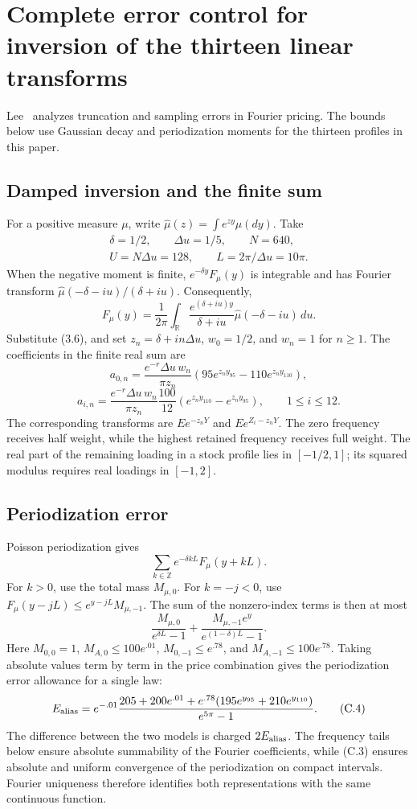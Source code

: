 \section{Complete error control for inversion of the thirteen linear transforms}

Lee~\cite{Lee2004} analyzes truncation and sampling errors in Fourier pricing. The bounds below use Gaussian decay and periodization moments for the thirteen profiles in this paper.

\subsection{Damped inversion and the finite sum}

For a positive measure \(\mu\), write \(\widehat\mu(z)=\int e^{zy}\mu(dy)\). Take
\[
\begin{gathered}
\delta=1/2,\qquad \Delta u=1/5,\qquad N=640,\\
U=N\Delta u=128,\qquad L=2\pi/\Delta u=10\pi.
\end{gathered}
\]
When the negative moment is finite, \(e^{-\delta y}F_\mu(y)\) is integrable and has Fourier transform \(\widehat\mu(-\delta-iu)/(\delta+iu)\). Consequently,
\[
F_\mu(y)=\frac1{2\pi}\int_{\mathbb R}
\frac{e^{(\delta+iu)y}}{\delta+iu}\widehat\mu(-\delta-iu)\,du.
\tag{C.1}
\]
Substitute (3.6), and set \(z_n=\delta+in\Delta u\), \(w_0=1/2\), and \(w_n=1\) for \(n\ge1\). The coefficients in the finite real sum are
\[
a_{0,n}=\frac{e^{-r}\Delta u\,w_n}{\pi z_n}
\left(95e^{z_ny_{95}}-110e^{z_ny_{110}}\right),
\]
\[
a_{i,n}=\frac{e^{-r}\Delta u\,w_n}{\pi z_n}\frac{100}{12}
\left(e^{z_ny_{110}}-e^{z_ny_{95}}\right),\qquad 1\le i\le12.
\tag{C.2}
\]
The corresponding transforms are \(Ee^{-z_nY}\) and \(Ee^{Z_i-z_nY}\). The zero frequency receives half weight, while the highest retained frequency receives full weight. The real part of the remaining loading in a stock profile lies in \([-1/2,1]\); its squared modulus requires real loadings in \([-1,2]\).

\subsection{Periodization error}

Poisson periodization gives
\[
\sum_{k\in\mathbb Z}e^{-\delta kL}F_\mu(y+kL).
\]
For \(k>0\), use the total mass \(M_{\mu,0}\). For \(k=-j<0\), use \(F_\mu(y-jL)\le e^{y-jL}M_{\mu,-1}\). The sum of the nonzero-index terms is then at most
\[
\frac{M_{\mu,0}}{e^{\delta L}-1}
+\frac{M_{\mu,-1}e^y}{e^{(1-\delta)L}-1}.
\tag{C.3}
\]
Here \(M_{0,0}=1\), \(M_{A,0}\le100e^{.01}\), \(M_{0,-1}\le e^{.78}\), and \(M_{A,-1}\le100e^{.78}\). Taking absolute values term by term in the price combination gives the periodization error allowance for a single law:
\[
E_{\rm alias}=
e^{-.01}\frac{
205+200e^{.01}
+e^{.78}(195e^{y_{95}}+210e^{y_{110}})
}{e^{5\pi}-1}.
\tag{C.4}
\]
The difference between the two models is charged \(2E_{\rm alias}\). The frequency tails below ensure absolute summability of the Fourier coefficients, while (C.3) ensures absolute and uniform convergence of the periodization on compact intervals. Fourier uniqueness therefore identifies both representations with the same continuous function.

